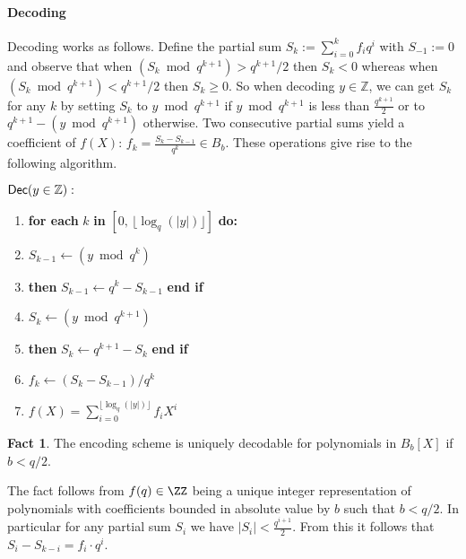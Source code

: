 \documentclass{article}
\theoremstyle{definition}
\newtheorem{fact}{Fact}
\begin{document}
\paragraph{Decoding}
Decoding works as follows. Define the partial sum $S_k := \sum_{i=0}^k f_i q^i$ with $S_{-1} := 0$ and observe that when $(S_k \bmod q^{k+1}) > q^{k+1}/2$ then $S_k < 0$ whereas when $(S_k \bmod q^{k+1}) < q^{k+1}/2$ then $S_k \geq 0$. 
So when decoding $y \in \mathbb{Z}$, we can get $S_k$ for any $k$ by setting $S_k$ to $y \bmod q^{k+1}$ if $y \bmod q^{k+1}$ is less than $\frac{q^{k+1}}{2}$ or to $q^{k+1}- (y \bmod q^{k+1})$ otherwise.
Two consecutive partial sums yield a coefficient of $f(X)$: $f_k = \frac{S_{k} - S_{k-1}}{q^{k}} \in B_{b}$. These operations give rise to the following algorithm.\\
\begin{minipage}{\textwidth}
\begin{mdframed}
\begin{flushleft}
	$\textsf{{Dec}}(y \in \mathbb{Z}):$
	\begin{enumerate}[nolistsep]
	    \item \textbf{for each} $k$ \textbf{in} $[0, \, \lfloor \log_q(|y|)\rfloor]$ \textbf{do:}\\
		\item \pcind[1] $S_{k-1} \gets (y \bmod q^{k})$
		\item \pcind[1]  \textbf{then} $S_{k-1} \gets q^{k}-S_{k-1}$ \textbf{end if}
		\item \pcind[1] $S_k \gets (y \bmod q^{k+1})$
		\item \pcind[1]  \textbf{then} $S_{k} \gets q^{k+1}-S_{k}$ \textbf{end if}
		\item \pcind[1] $f_k \gets (S_{k} - S_{k-1}) / q^k$
		\item \pcreturn $f(X) = \sum_{i=0}^{\lfloor \log_q(|y|)\rfloor} f_i X^i$
	\end{enumerate} 
\end{flushleft}
\end{mdframed}
\end{minipage}

\begin{fact}
	The encoding scheme is uniquely decodable for polynomials in $B_{b}[X]$ if $b<q/2$.
\end{fact}
The fact follows from $f(q)\in \ZZ$ being a unique integer representation of polynomials with coefficients bounded in absolute value by $b$ such that $b<q/2$. In particular for any partial sum $S_i$ we have $|S_i|<\frac{q^{i+1}}{2}$. From this it follows that $S_i-S_{k-i}=f_i \cdot q^i$.  
\end{document}
